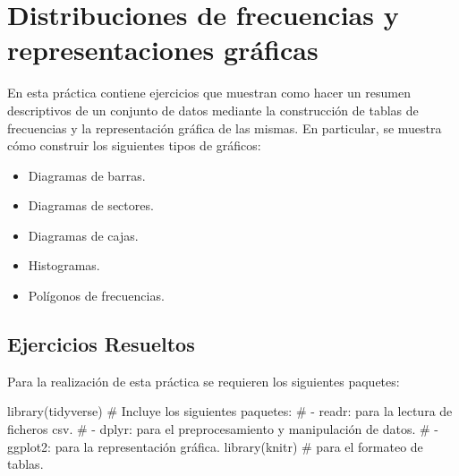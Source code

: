 \documentclass[
  spanish,
  a4paper,
]{scrreport}
\newenvironment{Shaded}{\begin{snugshade}}{\end{snugshade}}
\newcommand{\CommentTok}[1]{\textcolor[rgb]{0.37,0.37,0.37}{#1}}
\newcommand{\FunctionTok}[1]{\textcolor[rgb]{0.28,0.35,0.67}{#1}}
\newcommand{\NormalTok}[1]{\textcolor[rgb]{0.00,0.23,0.31}{#1}}
\providecommand{\tightlist}{%
  \setlength{\itemsep}{0pt}\setlength{\parskip}{0pt}}
\theoremstyle{definition}
\theoremstyle{remark}
\begin{document}

\chapter{Distribuciones de frecuencias y representaciones
gráficas}\label{distribuciones-de-frecuencias-y-representaciones-gruxe1ficas}

En esta práctica contiene ejercicios que muestran como hacer un resumen
descriptivos de un conjunto de datos mediante la construcción de tablas
de frecuencias y la representación gráfica de las mismas. En particular,
se muestra cómo construir los siguientes tipos de gráficos:

\begin{itemize}
\tightlist
\item
  Diagramas de barras.
\item
  Diagramas de sectores.
\item
  Diagramas de cajas.
\item
  Histogramas.
\item
  Polígonos de frecuencias.
\end{itemize}

\section{Ejercicios Resueltos}\label{ejercicios-resueltos-2}

Para la realización de esta práctica se requieren los siguientes
paquetes:

\begin{Shaded}
\begin{Highlighting}[]
\FunctionTok{library}\NormalTok{(tidyverse) }
\CommentTok{\# Incluye los siguientes paquetes:}
\CommentTok{\# {-} readr: para la lectura de ficheros csv. }
\CommentTok{\# {-} dplyr: para el preprocesamiento y manipulación de datos.}
\CommentTok{\# {-} ggplot2: para la representación gráfica.}
\FunctionTok{library}\NormalTok{(knitr) }\CommentTok{\# para el formateo de tablas.}
\end{Highlighting}
\end{Shaded}
\end{document}
